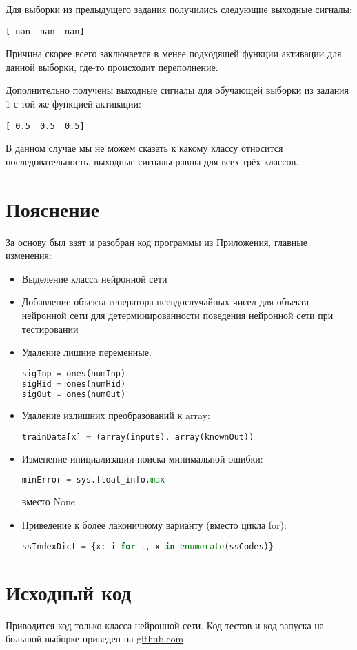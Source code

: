\documentclass{article} %
\begin{document}
Для выборки из предыдущего задания получились следующие выходные сигналы:
\begin{verbatim}
[ nan  nan  nan]
\end{verbatim}

Причина скорее всего заключается в менее подходящей функции активации для данной выборки, где-то происходит переполнение.

Дополнительно получены выходные сигналы для обучающей выборки из задания 1 с той же функцией активации:
\begin{verbatim}
[ 0.5  0.5  0.5]
\end{verbatim}

В данном случае мы не можем сказать к какому классу относится последовательность, выходные сигналы равны для всех трёх классов.

\section{Пояснение}
За основу был взят и разобран код программы из Приложения, главные изменения:
\begin{itemize}
	\item Выделение классa нейронной сети
	\item Добавление объекта генератора псевдослучайных чисел для объекта нейронной сети для детерминированности поведения нейронной сети при тестировании
	\item Удаление лишние переменные:
		\begin{lstlisting}[language=Python]
sigInp = ones(numInp)
sigHid = ones(numHid)
sigOut = ones(numOut)
		\end{lstlisting}
	\item Удаление излишних преобразований к array:
		\begin{lstlisting}[language=Python]
trainData[x] = (array(inputs), array(knownOut))
		\end{lstlisting}
	\item Изменение инициализации поиска минимальной ошибки:
		\begin{lstlisting}[language=Python]
minError = sys.float_info.max
		\end{lstlisting}
вместо None
	\item Приведение к более лаконичному варианту (вместо цикла for):
		\begin{lstlisting}[language=Python]
ssIndexDict = {x: i for i, x in enumerate(ssCodes)}
		\end{lstlisting}
\end{itemize}

\section{Исходный код}
Приводится код только класса нейронной сети. Код тестов и код запуска на большой выборке приведен на \href{https://github.com/SvichkarevAnatoly/Course-Python-Bioinformatics/tree/master/bioseq5}{github.com}.


\end{document}
